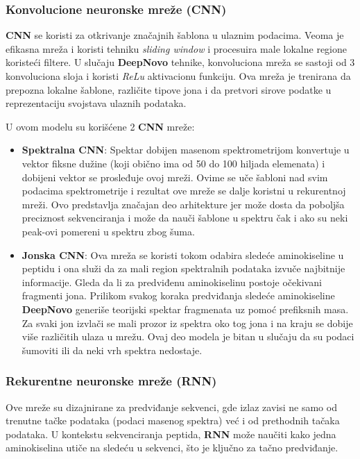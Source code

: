 \documentclass[12pt,oneside]{memoir}
\begin{document}
\subsubsection{Konvolucione neuronske mreže (CNN)}
\textbf{CNN} se koristi za otkrivanje značajnih šablona u ulaznim podacima. Veoma je efikasna mreža i koristi tehniku \emph{sliding window} i procesuira male lokalne regione koristeći filtere. U slučaju \textbf{DeepNovo} tehnike, konvoluciona mreža se sastoji od 3 konvoluciona sloja i koristi \emph{ReLu} aktivacionu funkciju. Ova mreža je trenirana da prepozna lokalne šablone, različite tipove jona i da pretvori sirove podatke u reprezentaciju svojstava ulaznih podataka.

U ovom modelu su korišćene 2 \textbf{CNN} mreže:

\begin{itemize}
\item \textbf{Spektralna CNN}: Spektar dobijen masenom spektrometrijom konvertuje u vektor fiksne dužine (koji obično ima od 50 do 100 hiljada elemenata) i dobijeni vektor se prosleđuje ovoj mreži. Ovime se uče šabloni nad svim podacima spektrometrije i rezultat ove mreže se dalje koristni u rekurentnoj mreži. Ovo predstavlja značajan deo arhitekture jer može dosta da poboljša preciznost sekvenciranja i može da nauči šablone u spektru čak i ako su neki peak-ovi pomereni u spektru zbog šuma.
\item \textbf{Jonska CNN}: Ova mreža se koristi tokom odabira sledeće aminokiseline u peptidu i ona služi da za mali region spektralnih podataka izvuče najbitnije informacije. Gleda da li za predviđenu aminokiselinu postoje očekivani fragmenti jona. Prilikom svakog koraka predviđanja sledeće aminokiseline \textbf{DeepNovo} generiše teorijski spektar fragmenata uz pomoć prefiksnih masa. Za svaki jon izvlači se mali prozor iz spektra oko tog jona i na kraju se dobije više različitih ulaza u mrežu. Ovaj deo modela je bitan u slučaju da su podaci šumoviti ili da neki vrh spektra nedostaje.
\end{itemize}

\subsubsection{Rekurentne neuronske mreže (RNN)}
Ove mreže su dizajnirane za predviđanje sekvenci, gde izlaz zavisi ne samo od trenutne tačke podataka (podaci masenog spektra) već i od prethodnih tačaka podataka. U kontekstu sekvenciranja peptida, \textbf{RNN} može naučiti kako jedna aminokiselina utiče na sledeću u sekvenci, što je ključno za tačno predviđanje.
\end{document}
